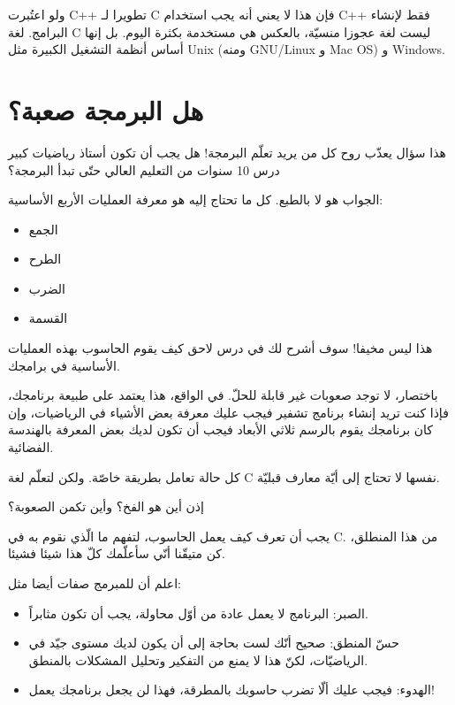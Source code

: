 ولو اعتُبرت
\textenglish{C++}
 تطويرا لـ
\textenglish{C}
 فإن هذا لا يعني أنه يجب استخدام
\textenglish{C++}
 فقط لإنشاء البرامج. لغة
\textenglish{C}
 ليست لغة عجوزا منسيّة، بالعكس هي مستخدمة بكثرة اليوم. بل إنها أساس أنظمة التشغيل الكبيرة مثل
\textenglish{Unix }
(ومنه
\textenglish{GNU/Linux}
 و
\textenglish{Mac OS}) و
\textenglish{Windows}.

\section{هل البرمجة صعبة؟}
هذا سؤال يعذّب روح كل من يريد تعلّم البرمجة! هل يجب أن تكون أستاذ رياضيات كبير درس 10 سنوات من التعليم العالي حتّى تبدأ البرمجة؟

الجواب هو لا بالطبع. كل ما تحتاج إليه هو معرفة العمليات الأربع الأساسية:
\begin{itemize}
  \item الجمع
  \item الطرح
  \item الضرب
  \item القسمة
\end{itemize}
هذا ليس مخيفا! سوف أشرح لك في درس لاحق كيف يقوم الحاسوب بهذه العمليات الأساسية في برامجك.

باختصار، لا توجد صعوبات غير قابلة للحلّ. في الواقع، هذا يعتمد على طبيعة برنامجك، فإذا كنت تريد إنشاء برنامج تشفير فيجب عليك معرفة بعض الأشياء في الرياضيات، وإن كان برنامجك يقوم بالرسم ثلاثي الأبعاد فيجب أن تكون لديك بعض المعرفة بالهندسة الفضائية.

كل حالة تعامل بطريقة خاصّة. ولكن لتعلّم لغة
\textenglish{C}
 نفسها لا تحتاج إلى أيّة معارف قبليّة.

\begin{question}
  إذن أين هو الفخ؟ وأين تكمن الصعوبة؟
\end{question}

يجب أن تعرف كيف يعمل الحاسوب، لتفهم ما الّذي نقوم به في C. من هذا المنطلق، كن متيقّنا أنّي سأعلّمك كلّ هذا شيئا فشيئا.

اعلم أن للمبرمج صفات أيضا مثل:
\begin{itemize}
  \item الصبر: البرنامج لا يعمل عادة من أوّل محاولة، يجب أن تكون مثابراً.
  \item حسّ المنطق: صحيح أنّك لست بحاجة إلى أن يكون لديك مستوى جيّد في الرياضيّات، لكنّ هذا لا يمنع من التفكير وتحليل المشكلات بالمنطق.
  \item الهدوء: فيجب عليك ألّا تضرب حاسوبك بالمطرقة، فهذا لن يجعل برنامجك يعمل!
\end{itemize}
